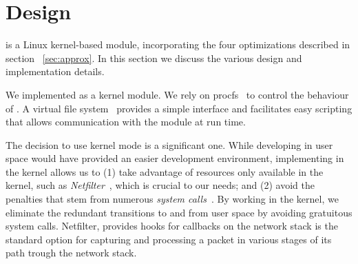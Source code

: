 \section{\oursys Design}\label{sec:design}
\oursys is a Linux kernel-based module, incorporating the four optimizations described in section ~\ref{sec:approx}. In this section we discuss the various design and implementation details. 

 We implemented \oursys as a kernel module. We rely on procfs~\cite{proc} to control the behaviour of \oursys. A virtual file system~\cite{virtfs} provides a simple interface and facilitates easy scripting that allows communication with the module at run time.

The decision to use kernel mode is a significant one. While developing in user space would have provided an easier development environment, implementing \oursys in the kernel allows us to (1) take advantage of resources only available in the kernel, such as \textit{Netfilter}~\cite{netfilter}, which is crucial to our needs; and (2) avoid the penalties that stem from numerous \textit{system calls}~\cite{Copy, FlexSC}. By working in the kernel, we eliminate the redundant transitions to and from user space by avoiding gratuitous system calls. Netfilter, provides hooks for callbacks on the network stack is the standard option for capturing and processing a packet in various stages of its path trough the network stack.  


